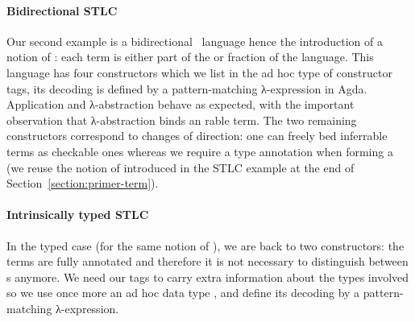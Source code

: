 \begin{center}
\end{center}

\paragraph*{Bidirectional STLC}\label{par:bidirectional} Our second example is a
bidirectional~\cite{pierce2000local} language hence the introduction of a
notion of : each term is either part of the  or
 fraction of the language. This language has four constructors
which we list in the ad hoc  type of constructor tags, its
decoding  is defined by a pattern-matching λ-expression in Agda.
Application and λ-abstraction behave as expected, with the important
observation that λ-abstraction binds an rable term. The two
remaining constructors correspond to changes of direction: one can freely
bed inferrable terms as checkable ones whereas we require a type
annotation when forming a  (we reuse the notion of  introduced
in the STLC example at the end of Section~\ref{section:primer-term}). %

\begin{center}
\begin{minipage}[t]{0.35\textwidth}
\end{minipage}\quad
\begin{minipage}[t]{0.5\textwidth}
\end{minipage}
\end{center}

\paragraph*{Intrinsically typed STLC}\label{par:intrinsicSTLC}
In the typed case (for the same notion of ), we are back to two
constructors: the terms are fully annotated and therefore it is not necessary
to distinguish between s anymore. We need our tags to carry extra
information about the types involved so we use once more an ad hoc data type
, and define its decoding  by a pattern-matching λ-expression.

